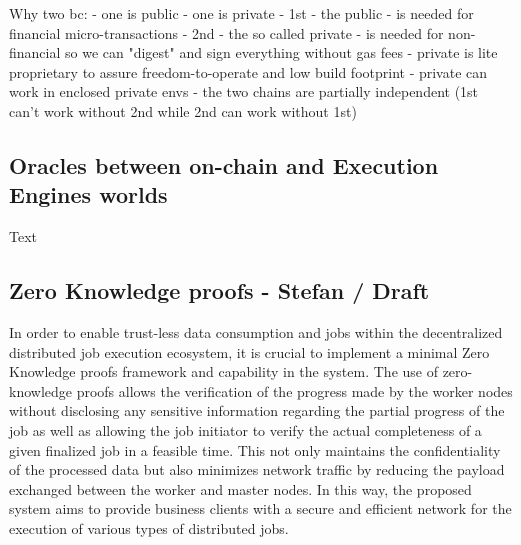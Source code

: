 \documentclass{article}
\begin{document}
Why two bc:
- one is public 
- one is private
- 1st - the public - is needed for financial micro-transactions
- 2nd - the so called private - is needed for non-financial so we can "digest" and sign everything without gas fees
- private is lite proprietary to assure freedom-to-operate and low build footprint
- private can work in enclosed private envs 
- the two chains are partially independent (1st can't work without 2nd while 2nd can work without 1st)

\subsection{Oracles between on-chain and Execution Engines worlds}
Text

\subsection{Zero Knowledge proofs - Stefan / Draft}
In order to enable trust-less data consumption and jobs within the decentralized distributed job execution ecosystem, it is crucial to implement a minimal Zero Knowledge proofs \cite{goldwasser2019knowledge} framework and capability in the system. The use of zero-knowledge proofs allows the verification of the progress made by the worker nodes without disclosing any sensitive information regarding the partial progress of the job as well as allowing the job initiator to verify the actual completeness of a given finalized job in a feasible time. This not only maintains the confidentiality of the processed data but also minimizes network traffic by reducing the payload exchanged between the worker and master nodes. In this way, the proposed system aims to provide business clients with a secure and efficient network for the execution of various types of distributed jobs.

  
  


\newpage
\end{document}
